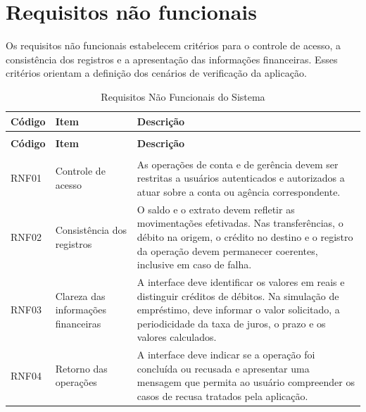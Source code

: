 \begin{xltabular}{\textwidth}{|>{\centering\arraybackslash}m{1.6cm}|>{\centering\arraybackslash}m{3.6cm}|X|}
\end{xltabular}

\section{Requisitos não funcionais}
\label{cap-concepcao-requisitos-nao-funcionais}

Os requisitos não funcionais estabelecem critérios para o controle de acesso, a consistência dos registros e a apresentação das informações financeiras. Esses critérios orientam a definição dos cenários de verificação da aplicação.

\renewcommand{\arraystretch}{1.4}

\begin{xltabular}{\textwidth}{|>{\centering\arraybackslash}m{1.6cm}|>{\centering\arraybackslash}m{3.6cm}|X|}
\caption{Requisitos Não Funcionais do Sistema}\label{tab:requisitos-nao-funcionais}\\
\hline
\textbf{Código} & \textbf{Item} & \textbf{Descrição} \\
\hline
\endfirsthead
{}\\
\hline
\textbf{Código} & \textbf{Item} & \textbf{Descrição} \\
\hline
\endhead
\hline
{}\\
\endfoot
\hline
\endlastfoot

RNF01 & Controle de acesso & As operações de conta e de gerência devem ser restritas a usuários autenticados e autorizados a atuar sobre a conta ou agência correspondente. \\
\hline
RNF02 & Consistência dos registros & O saldo e o extrato devem refletir as movimentações efetivadas. Nas transferências, o débito na origem, o crédito no destino e o registro da operação devem permanecer coerentes, inclusive em caso de falha. \\
\hline
RNF03 & Clareza das informações financeiras & A interface deve identificar os valores em reais e distinguir créditos de débitos. Na simulação de empréstimo, deve informar o valor solicitado, a periodicidade da taxa de juros, o prazo e os valores calculados. \\
\hline
RNF04 & Retorno das operações & A interface deve indicar se a operação foi concluída ou recusada e apresentar uma mensagem que permita ao usuário compreender os casos de recusa tratados pela aplicação. \\
\hline

\end{xltabular}

